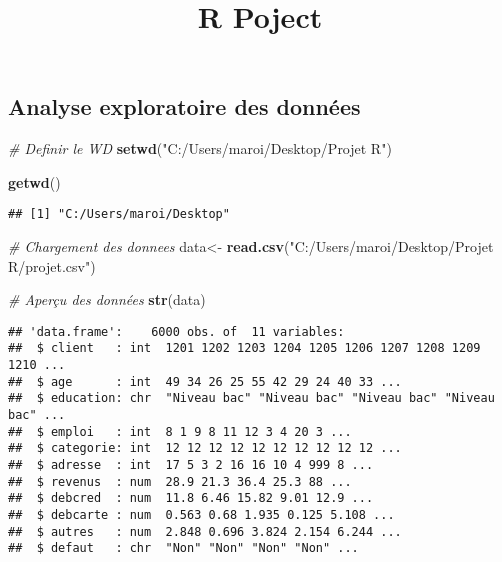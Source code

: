\documentclass[
]{article}
\title{R Poject}
\author{}
\date{\vspace{-2.5em}}
\newenvironment{Shaded}{\begin{snugshade}}{\end{snugshade}}
\newcommand{\CommentTok}[1]{\textcolor[rgb]{0.56,0.35,0.01}{\textit{#1}}}
\newcommand{\FunctionTok}[1]{\textcolor[rgb]{0.13,0.29,0.53}{\textbf{#1}}}
\newcommand{\NormalTok}[1]{#1}
\newcommand{\OtherTok}[1]{\textcolor[rgb]{0.56,0.35,0.01}{#1}}
\newcommand{\StringTok}[1]{\textcolor[rgb]{0.31,0.60,0.02}{#1}}
\begin{document}
\maketitle

\subsection{Analyse exploratoire des
données}\label{analyse-exploratoire-des-donnuxe9es}

\begin{Shaded}
\begin{Highlighting}[]
\CommentTok{\# Definir le WD}
\FunctionTok{setwd}\NormalTok{(}\StringTok{"C:/Users/maroi/Desktop/Projet R"}\NormalTok{)}
\end{Highlighting}
\end{Shaded}

\begin{Shaded}
\begin{Highlighting}[]
\FunctionTok{getwd}\NormalTok{()}
\end{Highlighting}
\end{Shaded}

\begin{verbatim}
## [1] "C:/Users/maroi/Desktop"
\end{verbatim}

\begin{Shaded}
\begin{Highlighting}[]
\CommentTok{\# Chargement des donnees}
\NormalTok{data}\OtherTok{\textless{}{-}} \FunctionTok{read.csv}\NormalTok{(}\StringTok{"C:/Users/maroi/Desktop/Projet R/projet.csv"}\NormalTok{)}
\end{Highlighting}
\end{Shaded}

\begin{Shaded}
\begin{Highlighting}[]
\CommentTok{\# Aperçu des données}
\FunctionTok{str}\NormalTok{(data)}
\end{Highlighting}
\end{Shaded}

\begin{verbatim}
## 'data.frame':    6000 obs. of  11 variables:
##  $ client   : int  1201 1202 1203 1204 1205 1206 1207 1208 1209 1210 ...
##  $ age      : int  49 34 26 25 55 42 29 24 40 33 ...
##  $ education: chr  "Niveau bac" "Niveau bac" "Niveau bac" "Niveau bac" ...
##  $ emploi   : int  8 1 9 8 11 12 3 4 20 3 ...
##  $ categorie: int  12 12 12 12 12 12 12 12 12 12 ...
##  $ adresse  : int  17 5 3 2 16 16 10 4 999 8 ...
##  $ revenus  : num  28.9 21.3 36.4 25.3 88 ...
##  $ debcred  : num  11.8 6.46 15.82 9.01 12.9 ...
##  $ debcarte : num  0.563 0.68 1.935 0.125 5.108 ...
##  $ autres   : num  2.848 0.696 3.824 2.154 6.244 ...
##  $ defaut   : chr  "Non" "Non" "Non" "Non" ...
\end{verbatim}
\end{document}
